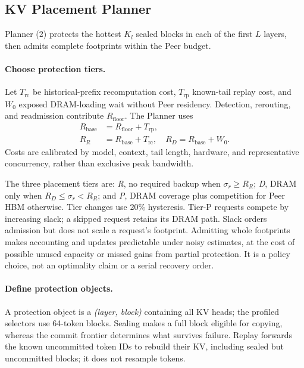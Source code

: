 \subsection{KV Placement Planner}
\label{sec:kv-placement}
\label{sec:capacity-allocation}

Planner (2) protects the hottest $K_l$ sealed blocks in each of the
first $L$ layers, then admits complete footprints within the Peer budget.
\paragraph{Choose protection tiers.}
Let $T_{\mathrm{rc}}$ be historical-prefix recomputation cost,
$T_{\mathrm{rp}}$ known-tail replay cost, and $W_0$ exposed DRAM-loading
wait without Peer residency.
Detection, rerouting, and readmission contribute $R_{\mathrm{floor}}$.
The Planner uses
\begin{equation}
\begin{aligned}
 R_{\mathrm{base}}&=R_{\mathrm{floor}}+T_{\mathrm{rp}},\\
 R_R&=R_{\mathrm{base}}+T_{\mathrm{rc}},\quad
 R_D=R_{\mathrm{base}}+W_0.
\end{aligned}
\label{eq:recovery-base}
\end{equation}
Costs are calibrated by model, context, tail length, hardware, and
representative concurrency, rather than exclusive peak bandwidth.

The three placement tiers are:
\emph{R}, no required backup when $\sigma_r\ge R_R$;
\emph{D}, DRAM only when $R_D\le\sigma_r<R_R$;
and \emph{P}, DRAM coverage plus competition for Peer HBM otherwise.
Tier changes use 20\% hysteresis. Tier-P requests compete by increasing slack; a skipped request retains
its DRAM path. Slack orders admission but does not scale a request's
footprint. Admitting whole footprints makes accounting and updates
predictable under noisy estimates, at the cost of possible unused
capacity or missed gains from partial protection. It is a policy choice,
not an optimality claim or a serial recovery order.

\paragraph{Define protection objects.}
A protection object is a \emph{(layer, block)} containing
all KV heads; the profiled selectors use 64-token blocks.
Sealing makes a full block eligible for copying, whereas the commit
frontier determines what survives failure. Replay forwards the known
uncommitted token IDs to rebuild their KV, including sealed but
uncommitted blocks; it does not resample tokens.

